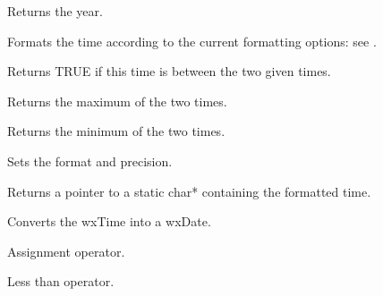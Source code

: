 Returns the year.

\label{wxtimeformattime}


Formats the time according to the current formatting options: see .

\label{wxtimeisbetween}


Returns TRUE if this time is between the two given times.

\label{wxtimemax}


Returns the maximum of the two times.

\label{wxtimemin}


Returns the minimum of the two times.

\label{wxtimesetformat}


Sets the format and precision.

\label{wxtimestring}


Returns a pointer to a static char* containing the formatted time.

\label{wxtimewxdate}


Converts the wxTime into a wxDate.

\label{wxtimeoperator}


Assignment operator.

\label{wxtimeoperatorle}


Less than operator.

